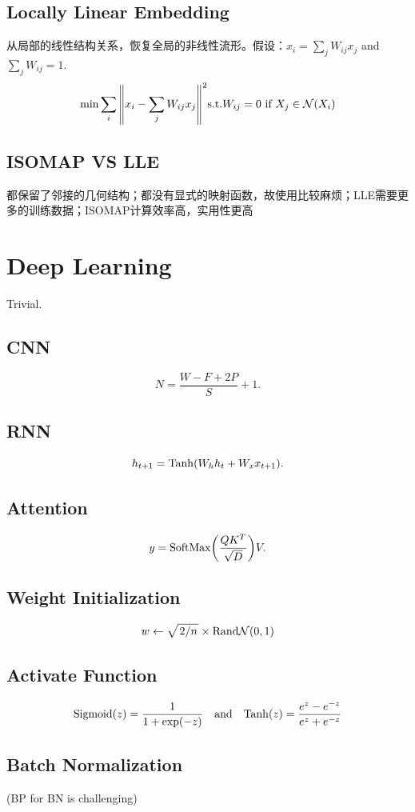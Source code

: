 \documentclass[a4paper,landscape]{article}
\begin{document}
\begin{tiny}
\begin{multicols}{4}
		\subsection{Locally Linear Embedding}
		从局部的线性结构关系，恢复全局的非线性流形。假设：$\hat{x}_i=\sum_jW_{ij}x_j$ and $\sum_j W_{ij}=1$.
		\[
			\min \sum_i\norm{x_i-\sum_jW_{ij}x_j}^2
			\text{s.t.} W_{ij}=0 \text{ if }X_j\in\+N(X_i)
		\]

		\subsection{ISOMAP VS LLE}
		都保留了邻接的几何结构；都没有显式的映射函数，故使用比较麻烦；LLE需要更多的训练数据；ISOMAP计算效率高，实用性更高



		\section{Deep Learning}
		Trivial.
		\begin{md}

			\subsection{CNN}
			\[
				N=\frac{W-F+2P}{S}+1
				.\]

			\subsection{RNN}
			\[
				h_{t+1}=\-{Tanh}(W_hh_t+W_xx_{t+1})
				.\]

			\subsection{Attention}
			\[
				y=\-{SoftMax}\qty(\frac{QK^T}{\sqrt{D}})V
				.\]

			\subsection{Weight Initialization}
			\[w\gets \sqrt{\flatfrac{2}{n}}\times\-{Rand}\+N(0,1)\]

			\subsection{Activate Function}
			\[
				\-{Sigmoid}(z)=\frac{1}{1+\exp(-z)}
				\qand
				\-{Tanh}(z)=\frac{e^z-e^{-z}}{e^z+e^{-z}}
			\]

			\subsection{Batch Normalization} (BP for BN is challenging)


\end{md}
\end{multicols}
\end{tiny}
\end{document}
